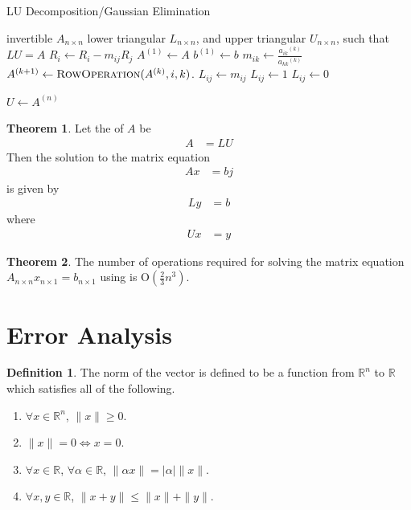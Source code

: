 \documentclass[fleqn, a4paper, 12pt, twoside, titlepage]{article}
\theoremstyle{definition}
\newtheorem{definition}{Definition}
\theoremstyle{theorem}
\newtheorem{theorem}{Theorem}
\begin{document}
\begin{algorithm}[H]
	\caption{LU Decomposition/Gaussian Elimination}
	\begin{algorithmic}[1]
		\Require invertible $A_{n \times n}$
		\Ensure lower triangular $L_{n \times n}$, and upper triangular $U_{n \times n}$, such that ${L U = A}$
		\Statex
			\State $R_i \gets R_i - m_{i j} R_j$ 
		\EndProcedure
		\Statex
		\State $A^{(1)} \gets A$
		\State $b^{(1)} \gets b$
				\State $m_{i k} \gets \frac{{a_{i k}}^{(k)}}{{a_{k k}}^{(k)}}$
				\State $A^{(k + 1)} \gets \Call{RowOperation}{A^{(k)},i,k}$.
			\EndFor
		\EndFor
		\Statex
			\State $L_{i j} \gets m_{i j}$
			\State $L_{i j} \gets 1$
		\Else
			\State $L_{i j} \gets 0$
		\EndIf

		\State $U \gets A^{(n)}$
	\end{algorithmic}
	\label{alg:LU_Decomposition}
\end{algorithm}

\begin{theorem}
	Let the  of $A$ be
	\begin{align*}
		A &= L U
	\end{align*}
	Then the solution to the matrix equation
	\begin{align*}
		A x &= bj
	\end{align*}
	is given by
	\begin{align*}
		L y &= b
	\end{align*}
	where
	\begin{align*}
		U x &= y
	\end{align*}
\end{theorem}

\begin{theorem}
	The number of operations required for solving the matrix equation ${A_{n \times n} x_{n \times 1} = b_{n \times 1}}$ using  is $\mathrm{O}\left( \frac{2}{3} n^3 \right)$.
\end{theorem}

\section{Error Analysis}

\begin{definition}
	The norm of the vector is defined to be a function from $\mathbb{R}^n$ to $\mathbb{R}$ which satisfies all of the following.
	\begin{enumerate}
		\item $\forall x \in \mathbb{R}^n$, $\|x\| \ge 0$.
		\item $\|x\| = 0 \iff x = 0$.
		\item $\forall x \in \mathbb{R}$, $\forall \alpha \in \mathbb{R}$, $\|\alpha x\| = |\alpha| \|x\|$.
		\item $\forall x,y \in \mathbb{R}$, $\|x + y\| \le \|x\| + \|y\|$.
	\end{enumerate}
\end{definition}
\end{document}
